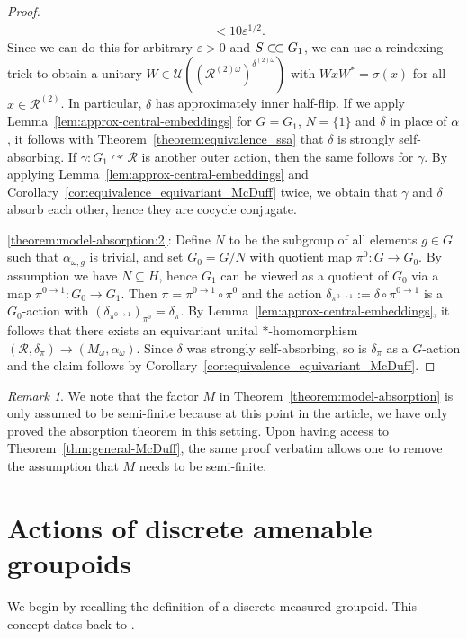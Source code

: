 \documentclass[11pt,a4paper]{article}
\theoremstyle{definition}
\theoremstyle{remark}
\newtheorem{remark}[theorem]{Remark}
\numberwithin{equation}{section}
\numberwithin{theorem}{section}
\newcommand{\e}{\varepsilon}
\newcommand{\ssubset}{\subset\joinrel\subset}
\begin{document}
\begin{proof}
\begin{align*}
&< 10\e^{1/2}.
\end{align*}
Since we can do this for arbitrary $\e >0$ and $S \ssubset G_1$, we can use a reindexing trick to obtain a unitary $W\in\mathcal{U}((\mathcal R^{(2)\omega})^{\delta^{(2)\omega}})$ with $WxW^*=\sigma(x)$ for all $x\in\mathcal R^{(2)}$.
In particular, $\delta$ has approximately inner half-flip.
If we apply Lemma~\ref{lem:approx-central-embeddings} for $G=G_1$, $N=\{1\}$ and $\delta$ in place of $\alpha$, it follows with Theorem~\ref{theorem:equivalence_ssa} that $\delta$ is strongly self-absorbing.
If $\gamma\colon G_1\curvearrowright\mathcal R$ is another outer action, then the same follows for $\gamma$.
By applying Lemma~\ref{lem:approx-central-embeddings} and Corollary~\ref{cor:equivalence_equivariant_McDuff} twice, we obtain that $\gamma$ and $\delta$ absorb each other, hence they are cocycle conjugate.

\ref{theorem:model-absorption:2}:
Define $N$ to be the subgroup of all elements $g\in G$ such that $\alpha_{\omega,g}$ is trivial, and set $G_0=G/N$ with quotient map $\pi^0: G\to G_0$.
By assumption we have $N\subseteq H$, hence $G_1$ can be viewed as a quotient of $G_0$ via a map $\pi^{0\to 1}: G_0\to G_1$.
Then $\pi=\pi^{0\to 1}\circ\pi^0$ and the action $\delta_{\pi^{0\to 1}}:=\delta\circ\pi^{0\to 1}$ is a $G_0$-action with $(\delta_{\pi^{0\to 1}})_{\pi^0}=\delta_\pi$.
By Lemma~\ref{lem:approx-central-embeddings}, it follows that there exists an equivariant unital $*$-homomorphism $(\mathcal R,\delta_\pi) \to (M_\omega,\alpha_\omega)$.
Since $\delta$ was strongly self-absorbing, so is $\delta_\pi$ as a $G$-action and the claim follows by Corollary~\ref{cor:equivalence_equivariant_McDuff}.
\end{proof}

\begin{remark}
We note that the factor $M$ in Theorem~\ref{theorem:model-absorption} is only assumed to be semi-finite because at this point in the article, we have only proved the absorption theorem in this setting.
Upon having access to Theorem~\ref{thm:general-McDuff}, the same proof verbatim allows one to remove the assumption that $M$ needs to be semi-finite.
\end{remark}

\section{Actions of discrete amenable groupoids}

We begin by recalling the definition of a discrete measured groupoid. This concept dates back to \cite{Mackey63}. 
\end{document}
